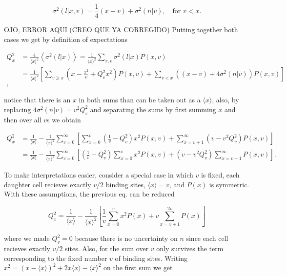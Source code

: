 \begin{equation}
  \sigma^2(l|x,v) = \frac{1}{4}(x-v) + \sigma^2(n|v),\quad \text{for } v<x.
\end{equation}

OJO, ERROR AQUI (CREO QUE YA CORREGIDO)
Putting together both cases we get by definition of expectations

\begin{equation*}
  \begin{split}
    Q_x^2 &= \frac{4}{\langle x\rangle^2}\left\langle\sigma^2(l|x)\right\rangle = \frac{1}{\langle x\rangle^2}\sum_{x,v}\sigma^2(l|x)P(x,v)\\
    &=\frac{1}{\langle x\rangle^2}\left[\sum_{v\geq x}\left(x-\frac{x^2}{v}+Q_v^2x^2\right)P(x,v) + \sum_{v<x}\left((x-v)+4\sigma^2(n|v)\right)P(x,v)\right]\\,
  \end{split}
\end{equation*}

notice that there is an $x$ in both sums than can be taken out as a $\langle x\rangle$, also, by replacing $4\sigma^2(n|v) = v^2Q_v^2$ and separating the sums by first summing $x$ and then over all $v$s we obtain

\begin{equation}
  \begin{split}
     Q_x^2 &= \frac{1}{\langle x\rangle} - \frac{1}{\langle x\rangle^2}\sum_{v=0}^\infty\left[\sum_{x=0}^v\left(\frac{1}{v}-Q_v^2\right)x^2P(x,v)+\sum_{x=v+1}^\infty\left(v-v^2Q_v^2\right)P(x,v)\right]\\
     &=\frac{1}{\langle x\rangle} - \frac{1}{\langle x\rangle^2}\sum_{v=0}^\infty\left[\left(\frac{1}{v}-Q_v^2\right)\sum_{x=0}^vx^2P(x,v)+\left(v-v^2Q_v^2\right)\sum_{x=v+1}^\infty P(x,v)\right].
  \end{split}
\end{equation}

To make interpretations easier, consider a special case in which $v$ is fixed, each daughter cell recieves exactly $v/2$ binding sites, $\langle x\rangle = v$, and $P(x)$ is symmetric. With these assumptions, the previous eq. can be reduced

\begin{equation*}
  Q_x^2 = \frac{1}{\langle x\rangle} - \frac{1}{\langle x\rangle^2}\left[\frac{1}{v}\sum_{x=0}^vx^2P(x)+v\sum_{x=v+1}^{2v}P(x)\right]
\end{equation*}

where we made $Q_v^2=0$ because there is no uncertainty on $n$ since each cell recieves exactly $v/2$ sites. Also, for the sum over $v$ only survives the term corresponding to the fixed number $v$ of binding sites. Writing $x^2 = \left(x-\langle x\rangle\right)^2 + 2x\langle x\rangle - \langle x\rangle^2$ on the first sum we get 

